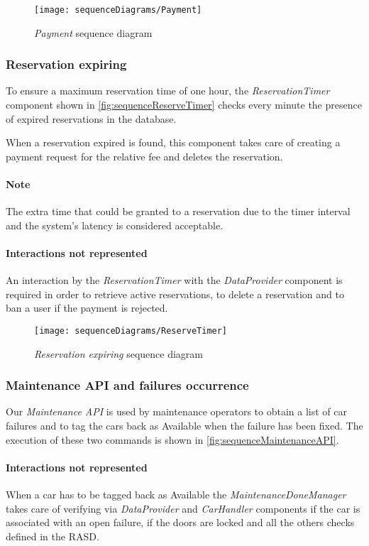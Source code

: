 \begin{figure}[h!]
	\centering
	\texttt{[image: sequenceDiagrams/Payment]}
	\caption{
		\label{fig:sequencePayment} 
		\emph{Payment} sequence diagram
	}
\end{figure}

\clearpage
\subsubsection{Reservation expiring}
To ensure a maximum reservation time of one hour, the \emph{ReservationTimer} component shown in \autoref{fig:sequenceReserveTimer} checks every minute the presence of expired reservations in the database. 

When a reservation expired is found, this component takes care of creating a payment request for the relative fee and deletes the reservation. 

\paragraph{Note}The extra time that could be granted to a reservation due to the timer interval and the system's latency is considered acceptable.

\paragraph{Interactions not represented} An interaction by the \emph{ReservationTimer} with the \emph{DataProvider} component is required in order to retrieve active reservations, to delete a reservation and to ban a user if the payment is rejected.
\begin{figure}[h!]
	\centering
	\texttt{[image: sequenceDiagrams/ReserveTimer]}
	\caption{
		\label{fig:sequenceReserveTimer} 
		\emph{Reservation expiring} sequence diagram
	}
\end{figure}

\clearpage
\subsubsection{Maintenance API and failures occurrence}
Our \emph{Maintenance API} is used by maintenance operators to obtain a list of car failures and to tag the cars back as Available when the failure has been fixed. The execution of these two commands is shown in \autoref{fig:sequenceMaintenanceAPI}.
\paragraph{Interactions not represented}When a car has to be tagged back as \mbox{Available} the \emph{MaintenanceDoneManager} takes care of verifying via \emph{DataProvider} and \emph{CarHandler} components if the car is associated with an open failure, if the doors are locked and all the others checks defined in the RASD\cite{RASD}.

